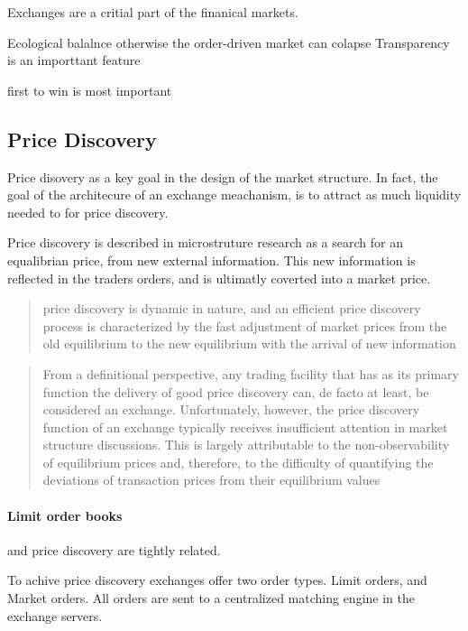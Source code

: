 \documentclass[12pt]{article}
\begin{document}
Exchanges are a critial part of the finanical markets.  

Ecological balalnce otherwise the order-driven market can colapse 
Transparency is an importtant feature 

first to win is most important 


\subsection*{Price Discovery}
Price disovery as a key goal in the design of the market structure. In fact, the goal of the architecure of an exchange meachanism, is to attract as much liquidity needed to for price discovery.  \cite{francioni_schwartz_2017}

Price discovery is described in microstruture research as a search for an equalibrian price, from new external information. This new information is reflected in the traders orders, and is ultimatly coverted into a market price. \citep{RePEc:nbr:nberwo:6257}

\begin{quote}
    price discovery is dynamic in nature, and an efficient price discovery process is characterized by the fast adjustment of market prices from the old equilibrium to the new equilibrium with the arrival of new information \cite{RePEc:udb:wpaper:uwec-2005-01-r}    
\end{quote}


\begin{quote}
From a definitional perspective, any trading facility that has as its primary function the delivery of good price discovery can, de facto at least, be considered an exchange. Unfortunately, however, the price discovery function of an  exchange typically receives insufficient attention in market structure discussions. This is largely attributable to the non-observability of equilibrium prices and, therefore, to the difficulty of quantifying the deviations of transaction prices from their equilibrium values \cite{francioni_schwartz_2017}
\end{quote} 


\paragraph*{Limit order books} and price discovery are tightly related. \citep{RePEc:nbr:nberwo:6257} \cite{RePEc:eee:jfinec:v:17:y:1986:i:1:p:5-26}

To achive price discovery exchanges offer two order types. Limit orders, and Market orders. All orders are sent to a centralized matching engine in the exchange servers. 
\end{document}
